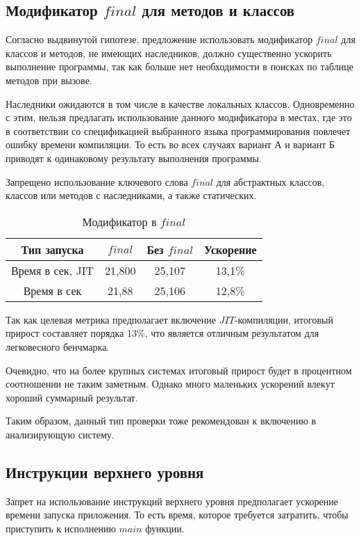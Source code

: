 \documentclass{mipt-thesis-bs}
\begin{document}
\subsection{Модификатор $final$ для методов и классов}

Согласно выдвинутой гипотезе, предложение использовать модификатор
$final$ для классов и методов, не имеющих наследников, должно существенно
ускорить выполнение программы, так как больше нет необходимости в поисках
по таблице методов при вызове.

Наследники ожидаются в том числе в качестве локальных классов. Одновременно с этим,
нельзя предлагать использование данного модификатора в местах, где это в соответствии
со спецификацией выбранного языка программирования повлечет ошибку времени компиляции.
То есть во всех случаях вариант А и вариант Б приводят к одинаковому результату выполнения
программы.

Запрещено использование ключевого слова $final$ для абстрактных классов, классов или методов
с наследниками, а также статических.

\begin{table}[h]
    \centering
    \begin{tabular}{|c|c|c|c|}
      \hline
      Тип запуска & $final$ & Без $final$ & Ускорение \\
      \hline
      Время в сек, JIT & 21,800 & 25,107 & 13,1\% \\
      \hline
      Время в сек & 21,88 & 25,106 & 12,8\% \\
      \hline
    \end{tabular}
    \caption{Модификатор в $final$}
  \end{table}

Так как целевая метрика предполагает включение $JIT$-компиляции, итоговый прирост составляет
порядка 13\%, что является отличным результатом для легковесного бенчмарка.

Очевидно, что на более крупных системах итоговый прирост будет в процентном соотношении не
таким заметным. Однако много маленьких ускорений влекут хороший суммарный результат.

Таким образом, данный тип проверки тоже рекомендован к включению в анализирующую систему.

\subsection{Инструкции верхнего уровня}

Запрет на использование инструкций верхнего уровня предполагает ускорение
времени запуска приложения. То есть время, которое требуется затратить, чтобы
приступить к исполнению $main$ функции.
\end{document}
